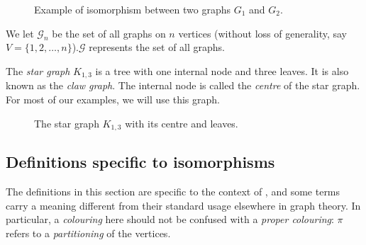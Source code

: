 \begin{figure}[h!]
    \centering
    \resizebox{\textwidth}{!}{%
    }
    \caption{Example of isomorphism between two graphs $G_1$ and $G_2$.}
  \end{figure}


\vspace{1em}

\begin{definition}\label{def:class of graphs}
We let \emph{$\mathcal{G}_n$} be the set of all graphs on $n$ vertices (without loss of generality, say $V = \{1, 2, \ldots, n\}$).\@ \emph{$\mathcal{G}$} represents the set of all graphs.
\end{definition}

\vspace{1em}

\begin{definition}\label{def:$K1_3$}

The \emph{star graph} $K_{1,3}$ is a tree with one internal node and three leaves. It is also known as the \emph{claw graph}. The internal node is called the \emph{centre} of the star graph. For most of our examples, we will use this graph.

\begin{figure}[ht]
    \centering
        
    \caption{The star graph $K_{1,3}$ with its centre and leaves.}
\end{figure}
\end{definition}
\subsection{Definitions specific to isomorphisms}

The definitions in this section are specific to the context of \Naut{}, and some terms carry a meaning different from their standard usage elsewhere in graph theory. In particular, a \emph{colouring} here should not be confused with a \emph{proper colouring}: $\pi$ refers to 
a \emph{partitioning} of the vertices.

\vspace{1em}

